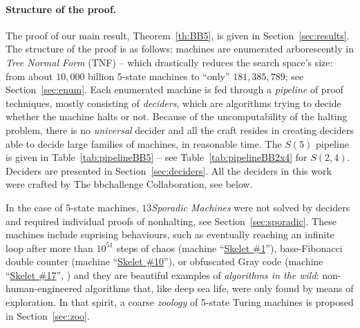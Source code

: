 \documentclass[a4paper,british]{article}
\theoremstyle{definition} %
\numberwithin{equation}{section}
\theoremstyle{definition} %
\newcommand{\BBtheFifthTNF}{181{,}385{,}789}
\newcommand{\numSporadic}{13\xspace}
\begin{document}
\paragraph{Structure of the proof.} The proof of our main result, Theorem~\ref{th:BB5}, is given in Section~\ref{sec:results}. The structure of the proof is as follows: machines are enumerated arborescently in \textit{Tree Normal Form} (TNF) \cite{Brady64} -- which drastically reduces the search space's size: from about $10{,}000$ billion 5-state machines to ``only'' $\BBtheFifthTNF$; see Section~\ref{sec:enum}. Each enumerated machine is fed through a \textit{pipeline} of proof techniques, mostly consisting of \textit{deciders}, which are algorithms trying to decide whether the machine halts or not. Because of the uncomputability of the halting problem, there is no \textit{universal} decider and all the craft resides in creating deciders able to decide large families of machines, in reasonable time. The $S(5)$ pipeline is given in Table~\ref{tab:pipelineBB5} -- see Table~\ref{tab:pipelineBB2x4} for $S(2,4)$. Deciders are presented in Section~\ref{sec:deciders}. All the deciders in this work were crafted by The bbchallenge Collaboration, see below.

In the case of 5-state machines, \numSporadic \textit{Sporadic Machines} were not solved by deciders and required individual proofs of nonhalting, see Section~\ref{sec:sporadic}. These machines include suprising behaviours, such as eventually reaching an infinite loop after more than $10^{51}$ steps of chaos (machine ``\href{https://bbchallenge.org/1RB1RD_1LC0RC_1RA1LD_0RE0LB_---1RC}{Skelet \#1}''), base-Fibonacci double counter (machine ``\href{https://bbchallenge.org/1RB0RA_0LC1RA_1RE1LD_1LC0LD_---0RB}{Skelet \#10}''), or obfuscated Gray code (machine ``\href{https://bbchallenge.org/1RB---_0LC1RE_0LD1LC_1RA1LB_0RB0RA}{Skelet \#17}'', \cite{xu2024skelet17fifthbusy}) and they are beautiful examples of \textit{algorithms in the wild}: non-human-engineered algorithms that, like deep sea life, were only found by means of exploration. In that spirit, a coarse \textit{zoology} of 5-state Turing machines is proposed in Section~\ref{sec:zoo}.
\end{document}
